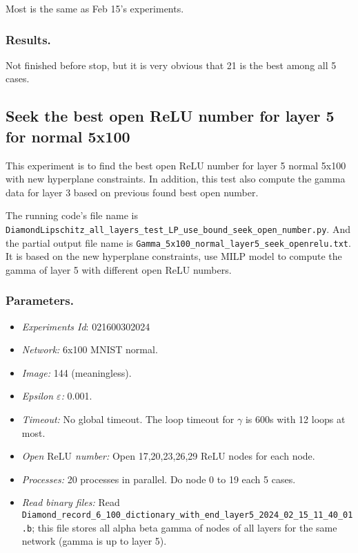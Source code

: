 \documentclass{llncs}
\newcommand{\ReLU}{\mathrm{ReLU}}
\begin{document}
Most is the same as Feb 15's experiments.

\subsubsection*{Results.}

Not finished before stop, but it is very obvious that 21 is the best among all 5 cases.



\subsection{Seek the best open ReLU number for layer 5 for normal 5x100}

This experiment is to find the best open ReLU number for layer 5 normal 5x100 with new hyperplane constraints. In addition, this test also compute the gamma data for layer 3 based on previous found best open number.

\vspace*{1ex}

The running code's file name is \verb*|DiamondLipschitz_all_layers_test_LP_use_bound_seek_open_number.py|. And the partial output file name is \verb*|Gamma_5x100_normal_layer5_seek_openrelu.txt|.  It is based on the new hyperplane constraints, use MILP model to compute the gamma of layer 5 with different open ReLU numbers.

\subsubsection*{Parameters.}

\begin{itemize}
	\item\emph{Experiments Id}: 021600302024
	
	\item\emph{Network:} 6x100 MNIST normal. 
	
	\item\emph{Image:} 144 (meaningless).
	
	\item\emph{Epsilon $\varepsilon$:} 0.001.
	
	\item\emph{Timeout:} No global timeout. The loop timeout for $\gamma$ is 600s with 12 loops at most.
	
	\item\emph{Open $\ReLU$ number:} Open 17,20,23,26,29 ReLU nodes for each node.
	
	\item\emph{Processes:} 20 processes in parallel. Do node 0 to 19 each 5 cases.
	
	\item\emph{Read binary files:} Read \verb*|Diamond_record_6_100_dictionary_with_end_layer5_2024_02_15_11_40_01.b|; this file stores all alpha beta gamma of nodes of all layers for the same network (gamma is up to layer 5). 
\end{itemize}
\end{document}
